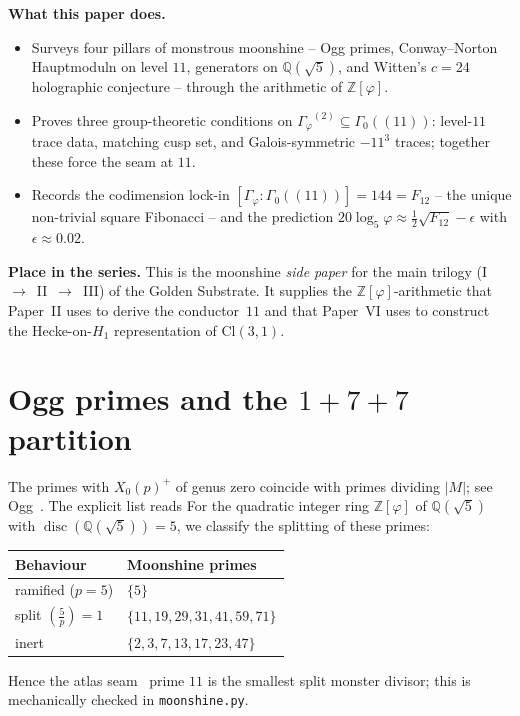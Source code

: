 \documentclass[11pt,a4paper]{article}
\theoremstyle{plain}
\theoremstyle{definition}
\theoremstyle{remark}
\numberwithin{equation}{section}
\providecommand{\Cl}{\mathrm{Cl}}
\providecommand{\Z}{\mathbb{Z}}
\providecommand{\Q}{\mathbb{Q}}
\providecommand{\Zp}{\ensuremath{\mathbb{Z}[\varphi]}}
\providecommand{\Qp}{\ensuremath{\mathbb{Q}(\sqrt{5})}}
\providecommand{\Gphi}{\ensuremath{\Gamma_{\varphi}}}
\providecommand{\vp}{\varphi}
\DeclareMathOperator{\disc}{disc}
\begin{document}
\medskip
\noindent\textbf{What this paper does.}
\begin{itemize}[leftmargin=1.5em,nosep,topsep=2pt]
  \item Surveys four pillars of monstrous moonshine -- Ogg primes,
        Conway--Norton Hauptmoduln on level $11$, generators on
        $\Q(\sqrt 5)$, and Witten's $c{=}24$ holographic conjecture
        -- through the arithmetic of $\Z[\vp]$.
  \item Proves three group-theoretic conditions on
        $\Gphi^{(2)}\subseteq\Gamma_{0}((11))$:
        level-$11$ trace data, matching cusp set, and Galois-symmetric
        $-11^{3}$ traces; together these force the seam at $11$.
  \item Records the codimension lock-in
        $[\Gphi:\Gamma_{0}((11))] = 144 = F_{12}$ -- the unique
        non-trivial square Fibonacci -- and the prediction
        $20\log_{5}\vp\approx\tfrac{1}{2}\sqrt{F_{12}} - \epsilon$
        with $\epsilon\approx 0.02$.
\end{itemize}

\medskip
\noindent\textbf{Place in the series.}
This is the moonshine \emph{side paper} for the main trilogy
(I~$\to$~II~$\to$~III) of the Golden Substrate.  It supplies the
$\Z[\vp]$-arithmetic that Paper~II uses to derive the conductor~$11$
and that Paper~VI uses to construct the Hecke-on-$H_{1}$
representation of $\Cl(3,1)$.

\section{Ogg primes and the $1{+}7{+}7$ partition}
The primes with $X_{0}(p)^{+}$ of genus zero coincide with primes dividing $|M|$;
see Ogg~\cite{Og75}. The explicit list reads
For the quadratic integer ring $\Zp$ of $\Qp$ with $\disc(\Qp)=5$, we classify the splitting of these primes:
\begin{center}
\begin{tabular}{@{}ll@{}}\hline
\textbf{Behaviour} & \textbf{Moonshine primes} \\\hline
ramified ($p=5$) & $\{5\}$ \\
split $\left(\frac{5}{p}\right)=1$ &
$\{11,19,29,31,41,59,71\}$ \\
inert & $\{2,3,7,13,17,23,47\}$ \\\hline
\end{tabular}
\end{center}
Hence the atlas seam~\cite{golden-tetrad} prime $11$ is the smallest
split monster divisor; this is mechanically checked in \texttt{moonshine.py}.
\end{document}
